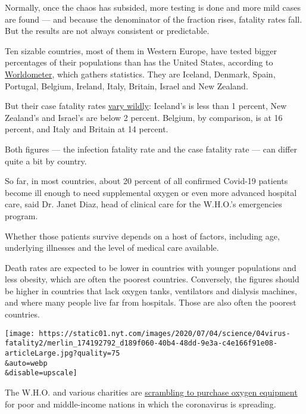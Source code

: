 Normally, once the chaos has subsided, more testing is done and more
mild cases are found --- and because the denominator of the fraction
rises, fatality rates fall. But the results are not always consistent or
predictable.

Ten sizable countries, most of them in Western Europe, have tested
bigger percentages of their populations than has the United States,
according to
\href{https://www.worldometers.info/coronavirus/}{Worldometer}, which
gathers statistics. They are Iceland, Denmark, Spain, Portugal, Belgium,
Ireland, Italy, Britain, Israel and New Zealand.

But their case fatality rates
\href{https://fivethirtyeight.com/features/coronavirus-case-counts-are-meaningless/?campaign_id=9\&emc=edit_nn_20200605\&instance_id=19111\&nl=the-morning\&regi_id=3423762\&segment_id=30155\&te=1\&user_id=2f7d5ee538b6384a048aa9442c9b48c2}{vary
wildly}: Iceland's is less than 1 percent, New Zealand's and Israel's
are below 2 percent. Belgium, by comparison, is at 16 percent, and Italy
and Britain at 14 percent.

Both figures --- the infection fatality rate and the case fatality rate
--- can differ quite a bit by country.

So far, in most countries, about 20 percent of all confirmed Covid-19
patients become ill enough to need supplemental oxygen or even more
advanced hospital care, said Dr. Janet Diaz, head of clinical care for
the W.H.O.'s emergencies program.

Whether those patients survive depends on a host of factors, including
age, underlying illnesses and the level of medical care available.

Death rates are expected to be lower in countries with younger
populations and less obesity, which are often the poorest countries.
Conversely, the figures should be higher in countries that lack oxygen
tanks, ventilators and dialysis machines, and where many people live far
from hospitals. Those are also often the poorest countries.

\texttt{[image: https://static01.nyt.com/images/2020/07/04/science/04virus-fatality2/merlin\_174192792\_d189f060-40b4-48dd-9e3a-c4e166f91e08-articleLarge.jpg?quality=75\\\&auto=webp\\\&disable=upscale]}

The W.H.O. and various charities are
\href{https://www.nytimes.com/2020/06/23/health/coronavirus-oxygen-africa.html}{scrambling
to purchase oxygen equipment} for poor and middle-income nations in
which the coronavirus is spreading.

